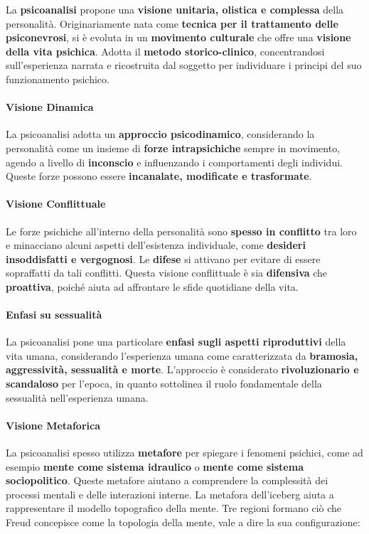 \documentclass{subfiles}
\begin{document}
La \textbf{psicoanalisi} propone una \textbf{visione unitaria, olistica e complessa} della 
personalità. Originariamente nata come \textbf{tecnica per il trattamento delle psiconevrosi}, 
si è evoluta in un \textbf{movimento culturale} che offre una \textbf{visione della vita psichica}. 
Adotta il \textbf{metodo storico-clinico}, concentrandosi sull'esperienza narrata e ricostruita 
dal soggetto per individuare i principi del suo funzionamento psichico.\\

\paragraph*{Visione Dinamica}
La psicoanalisi adotta un \textbf{approccio psicodinamico}, considerando la personalità come un 
insieme di \textbf{forze intrapsichiche} sempre in movimento, agendo a livello di 
\textbf{inconscio} e influenzando i comportamenti degli individui. 
Queste forze possono essere \textbf{incanalate, modificate e trasformate}.\\

\paragraph*{Visione Conflittuale}
Le forze psichiche all'interno della personalità sono \textbf{spesso in conflitto} tra loro e 
minacciano alcuni aspetti dell'esistenza individuale, come 
\textbf{desideri insoddisfatti e vergognosi}. Le \textbf{difese} si attivano per evitare di 
essere sopraffatti da tali conflitti. Questa visione conflittuale è sia \textbf{difensiva} che 
\textbf{proattiva}, poiché aiuta ad affrontare le sfide quotidiane della vita.\\

\paragraph*{Enfasi su sessualità}
La psicoanalisi pone una particolare \textbf{enfasi sugli aspetti riproduttivi} della vita 
umana, considerando l'esperienza umana come caratterizzata da 
\textbf{bramosia, aggressività, sessualità e morte}. 
L'approccio è considerato \textbf{rivoluzionario e scandaloso} per l'epoca, 
in quanto sottolinea il ruolo fondamentale della sessualità nell'esperienza umana.\\

\paragraph*{Visione Metaforica}
La psicoanalisi spesso utilizza \textbf{metafore} per spiegare i fenomeni psichici, come ad 
esempio \textbf{mente come sistema idraulico} o \textbf{mente come sistema sociopolitico}. 
Queste metafore aiutano a comprendere la complessità dei processi mentali e delle interazioni interne. 
La metafora dell'iceberg aiuta a rappresentare il modello topografico della mente. 
Tre regioni formano ciò che Freud concepisce come la topologia della mente, vale a dire la sua 
configurazione: \\
\end{document}
